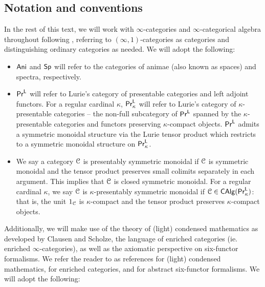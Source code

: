 \subsection{Notation and conventions}\label{subsec: notation and conventions}
In the rest of this text, we will work with $\infty$-categories and $\infty$-categorical algebra throughout following \cite{HTT,HA,kerodon}, referring to $(\infty,1)$-categories as categories and distinguishing ordinary categories as needed. We will adopt the following: 
\begin{itemize}
  \item $\mathsf{Ani}$ and $\mathsf{Sp}$ will refer to the categories of animae (also known as spaces) and spectra, respectively. 
  \item $\mathsf{Pr}^{\mathsf{L}}$ will refer to Lurie's category of presentable categories and left adjoint functors. For a regular cardinal $\kappa$, $\mathsf{Pr}^{\mathsf{L}}_{\kappa}$ will refer to Lurie's category of $\kappa$-presentable categories -- the non-full subcategory of $\mathsf{Pr}^{\mathsf{L}}$ spanned by the $\kappa$-presentable categories and functors preserving $\kappa$-compact objects. $\mathsf{Pr}^{\mathsf{L}}$ admits a symmetric monoidal structure via the Lurie tensor product which restricts to a symmetric monoidal structure on $\mathsf{Pr}^{\mathsf{L}}_{\kappa}$.
  \item We say a category $\EuScript{C}$ is presentably symmetric monoidal if $\EuScript{C}$ is symmetric monoidal and the tensor product preserves small colimits separately in each argument. This implies that $\EuScript{C}$ is closed symmetric monoidal. For a regular cardinal $\kappa$, we say $\EuScript{C}$ is $\kappa$-presentably symmetric monoidal if $\EuScript{C}\in\mathsf{CAlg}(\mathsf{Pr}^{\mathsf{L}}_{\kappa})$: that is, the unit $1_{\EuScript{C}}$ is $\kappa$-compact and the tensor product preserves $\kappa$-compact objects. 
\end{itemize}
Additionally, we will make use of the theory of (light) condensed mathematics as developed by Clausen and Scholze, the language of enriched categories (ie. enriched $\infty$-categories), as well as the axiomatic perspective on six-functor formalisms. We refer the reader to \cite{Condensed,Analytic,Complex,AnalyticStacks,CamargoSolid} as references for (light) condensed mathematics, \cite{MannRigid6FF,HeyerMann6FF,RamziLocRigid,RamziDualizable,ReutterZettoEnriched} for enriched categories, and \cite{MannRigid6FF,HeyerMann6FF,ConstructionCLL} for abstract six-functor formalisms. We will adopt the following: 
